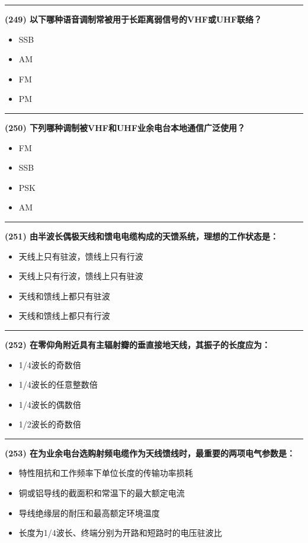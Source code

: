 \documentclass[twocolumn]{ctexart}  %
\begin{document}
\noindent\rule{0.5\textwidth}{1pt}
\heiti \textbf{(249) 以下哪种语音调制常被用于长距离弱信号的VHF或UHF联络？} \songti {\color{gray} [LK1202] }
\begin{itemize}
	\item  SSB
	\item  AM
	\item  FM
	\item  PM
\end{itemize}


\noindent\rule{0.5\textwidth}{1pt}
\heiti \textbf{(250) 下列哪种调制被VHF和UHF业余电台本地通信广泛使用？} \songti {\color{gray} [LK1203] }
\begin{itemize}
	\item  FM
	\item  SSB
	\item  PSK
	\item  AM
\end{itemize}


\noindent\rule{0.5\textwidth}{1pt}
\heiti \textbf{(251) 由半波长偶极天线和馈电电缆构成的天馈系统，理想的工作状态是：} \songti {\color{gray} [LK0702] }
\begin{itemize}
	\item  天线上只有驻波，馈线上只有行波
	\item  天线上只有行波，馈线上只有驻波
	\item  天线和馈线上都只有驻波
	\item  天线和馈线上都只有行波
\end{itemize}


\noindent\rule{0.5\textwidth}{1pt}
\heiti \textbf{(252) 在零仰角附近具有主辐射瓣的垂直接地天线，其振子的长度应为：} \songti {\color{gray} [LK0904] }
\begin{itemize}
	\item  1/4波长的奇数倍
	\item  1/4波长的任意整数倍
	\item  1/4波长的偶数倍
	\item  1/2波长的奇数倍
\end{itemize}


\noindent\rule{0.5\textwidth}{1pt}
\heiti \textbf{(253) 在为业余电台选购射频电缆作为天线馈线时，最重要的两项电气参数是：} \songti {\color{gray} [LK0910] }
\begin{itemize}
	\item  特性阻抗和工作频率下单位长度的传输功率损耗
	\item  铜或铝导线的截面积和常温下的最大额定电流
	\item  导线绝缘层的耐压和最高额定环境温度
	\item  长度为1/4波长、终端分别为开路和短路时的电压驻波比
\end{itemize}
\end{document}
